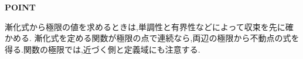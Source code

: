 \begin{bookpoint}
  \textbf{POINT}\par
  漸化式から極限の値を求めるときは,単調性と有界性などによって収束を先に確かめる.
  漸化式を定める関数が極限の点で連続なら,両辺の極限から不動点の式を得る.関数の極限では,近づく側と定義域にも注意する.
\end{bookpoint}
